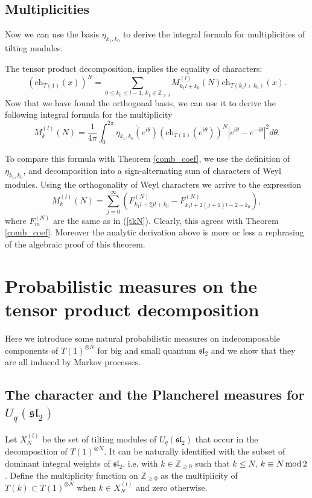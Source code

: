 \documentclass[11pt]{amsart}
\newcommand\lie[1]{\mathfrak{#1}}
\newcommand{\Z}{\mathbb{Z}}
\begin{document}
\subsection{Multiplicities}\label{integralchar}
Now we can use the basis $\eta_{k_1,k_0}$ to derive the integral formula for multiplicities of tilting modules. 

The tensor product decomposition, implies the equality of characters:
\begin{equation*}
(\mathrm{ch}_{T(1)}(x))^N=\sum_{0\leq k_0\leq l-1,\, k_1\in\mathbb{Z}_{\geq 0}}M^{(l)}_{k_1l+k_0}(N)\mathrm{ch}_{T(k_1l+k_0)}(x).
\end{equation*}
Now that we have found the orthogonal basis, we can use it to derive  the following integral formula for the multiplicity
\begin{equation*}
M^{(l)}_{k}(N)=\frac{1}{4\pi}\int_{0}^{2\pi}\overline{\eta_{k_1,k_0}(e^{i\theta})}(\mathrm{ch}_{T(1)}(e^{i\theta}))^N|e^{i\theta}-e^{-i\theta}|^2d\theta.
\end{equation*}

To compare this formula with Theorem \ref{comb_coef}, we use the definition of $\eta_{k_1,k_0}$, and decomposition into a sign-alternating sum of characters of Weyl modules. Using the orthogonality of Weyl characters we arrive to the expression
\begin{equation*}
M^{(l)}_{k}(N)=\sum_{j=0}^\infty (F_{k_1l+2jl+k_0}^{(N)}-F_{k_1l+2(j+1)l-2-k_0}^{(N)}),
\end{equation*}
where $F^{(N)}_m$ are the same as in (\ref{tkN}). 
Clearly, this agrees with Theorem \ref{comb_coef}. Moreover the analytic derivation above is more or less a rephrasing of the algebraic proof of this theorem. 



\section{Probabilistic measures on the tensor product decomposition}\label{probmeas}
Here we introduce some natural probabilistic measures on indecomposable components of $T(1)^{\otimes N}$ for big and small quantum $\lie{sl}_2$ and we show that they are all induced by Markov processes. 
\subsection{The character and the Plancherel measures for $U_q(\lie{sl}_2)$ }
Let $X^{(l)}_N$ be the set of tilting modules of $U_q(\lie{sl}_2)$ that occur in the decomposition of $T(1)^{\otimes N}$. It can be naturally identified with the subset of dominant integral weights of $\lie{sl}_2$, i.e.  with $k\in \Z_{\geq 0}$ such that $k\leq N$, $k\equiv N\,{\rm mod}\,2$. Define the multiplicity function on $\Z_{\geq 0}$ as the multiplicity of $T(k)\subset T(1)^{\otimes N}$ when $k\in X^{(l)}_N$ and zero otherwise.
\end{document}
